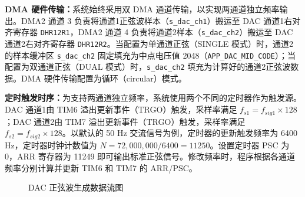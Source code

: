 \documentclass[UTF8,a4paper,zihao=-4,fontset=macnew]{ctexart}
\begin{document}
\textbf{DMA 硬件传输：}系统始终采用双 DMA 通道传输，以实现两通道独立频率输出。DMA2 通道 3 负责将通道1正弦波样本（\texttt{s\_dac\_ch1}）搬运至 DAC 通道1右对齐寄存器 \texttt{DHR12R1}，DMA2 通道 4 负责将通道2样本（\texttt{s\_dac\_ch2}）搬运至 DAC 通道2右对齐寄存器 \texttt{DHR12R2}。当配置为单通道正弦（SINGLE 模式）时，通道2的样本缓冲区 \texttt{s\_dac\_ch2} 固定填充为中点电压值 2048（\texttt{APP\_DAC\_MID\_CODE}）；当配置为双通道正弦（DUAL 模式）时，\texttt{s\_dac\_ch2} 填充为计算好的通道2正弦波数据。DMA 硬件传输配置为循环（circular）模式。

\textbf{定时触发时序：}为支持两通道独立频率，系统使用两个不同的定时器作为触发源。DAC 通道1由 TIM6 溢出更新事件（TRGO）触发，采样率满足 $f_{s1} = f_{sig1} \times 128$；DAC 通道2由 TIM7 溢出更新事件（TRGO）触发，采样率满足 $f_{s2} = f_{sig2} \times 128$。以默认的 50 Hz 交流信号为例，定时器的更新触发频率为 6400 Hz，定时器时钟计数值为 $N = 72{,}000{,}000 / 6400 = 11250$。设置定时器 PSC 为 0，ARR 寄存器为 11249 即可输出标准正弦信号。修改频率时，程序根据各通道频率分别计算并更新 TIM6 和 TIM7 的 ARR/PSC。

\begin{figure}[H]
\centering
{}
\caption{DAC 正弦波生成数据流图}
\label{fig:dac-flow}
\end{figure}
\end{document}

